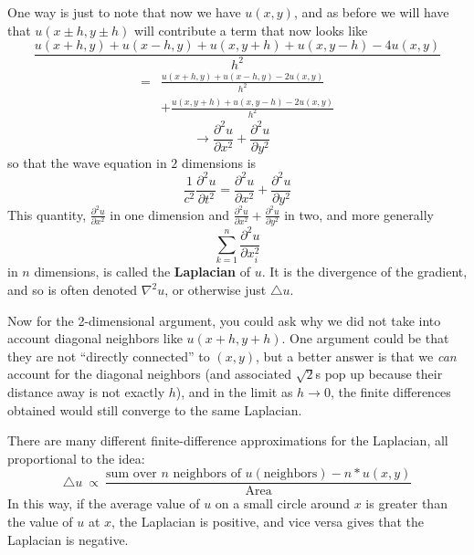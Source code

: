 \documentclass[../master.tex]{subfiles}
\begin{document}
	One way is just to note that now we have $u(x,y)$, and as before we will have that $u(x\pm h, y \pm h)$ will contribute a term that now looks like
	\begin{equation*}
		\frac{u(x+h,y) + u(x-h,y) + u(x,y+h) + u(x,y-h) - 4 u(x,y)}{h^2}
	\end{equation*}
	\begin{align*}
		 =  &\frac{u(x+h,y) + u(x-h,y)- 2u(x,y)}{h^2}\\ 
		 &+ \frac{u(x,y+h) + u(x,y-h) - 2 u(x,y)}{h^2} 
	\end{align*}
	\begin{equation*}
		\rightarrow \frac{\partial^2 u}{\partial x^2} + \frac{\partial^2 u}{\partial y^2} ~~~~
	\end{equation*}
	so that the wave equation in $2$ dimensions is
	\begin{equation}
		\frac{1}{c^2} \frac{\partial^2 u}{\partial t^2} = \frac{\partial^2 u}{\partial x^2} + \frac{\partial^2 u}{\partial y^2}
	\end{equation}
	This quantity, $\frac{\partial^2 u}{\partial x^2}$ in one dimension and $\frac{\partial^2 u}{\partial x^2} + \frac{\partial^2 u}{\partial y^2}$ in two, and more generally
	\begin{equation*}
		\sum_{k=1}^n \frac{\partial^2 u}{\partial x_i^2}
	\end{equation*}
	in $n$ dimensions, is called the \textbf{Laplacian} of $u$. It is the divergence of the gradient, and so is often denoted $\nabla^2 u$, or otherwise just $\triangle u$. 
	
	Now for the 2-dimensional argument, you could ask why we did not take into account diagonal neighbors like $u(x+h, y+h)$. One argument could be that they are not ``directly connected'' to $(x,y)$, but a better answer is that we \emph{can} account for the diagonal neighbors (and associated $\sqrt 2$s pop up because their distance away is not exactly $h$), and in the limit as $h \rightarrow 0$, the finite differences obtained would still converge to the same Laplacian. 
	\begin{concept}
	There are many different finite-difference approximations for the Laplacian, all proportional to the idea:
		\begin{equation*}
			\triangle  u ~\propto~ \frac{ \text{sum over } n \text{ neighbors of } u(\text{neighbors}) - n * u(x,y) }{\text{Area}}
		\end{equation*}
		In this way, if the average value of $u$ on a small circle around $x$ is greater than the value of $u$ at $x$, the Laplacian is positive, and vice versa gives that the Laplacian is negative. 
	\end{concept}
	
\end{document}
